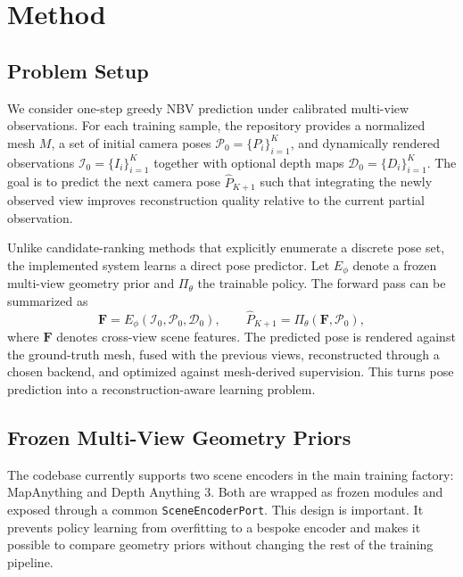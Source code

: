 \section{Method}
\label{sec:method}

\subsection{Problem Setup}
\label{sec:problem}

We consider one-step greedy NBV prediction under calibrated multi-view observations. For each training sample, the repository provides a normalized mesh $M$, a set of initial camera poses $\mathcal{P}_{0}=\{P_i\}_{i=1}^{K}$, and dynamically rendered observations $\mathcal{I}_{0}=\{I_i\}_{i=1}^{K}$ together with optional depth maps $\mathcal{D}_{0}=\{D_i\}_{i=1}^{K}$. The goal is to predict the next camera pose $\hat{P}_{K+1}$ such that integrating the newly observed view improves reconstruction quality relative to the current partial observation.

Unlike candidate-ranking methods that explicitly enumerate a discrete pose set, the implemented system learns a direct pose predictor. Let $E_{\phi}$ denote a frozen multi-view geometry prior and $\Pi_{\theta}$ the trainable policy. The forward pass can be summarized as
\begin{equation}
    \mathbf{F} = E_{\phi}(\mathcal{I}_{0}, \mathcal{P}_{0}, \mathcal{D}_{0}), \qquad
    \hat{P}_{K+1} = \Pi_{\theta}(\mathbf{F}, \mathcal{P}_{0}),
\end{equation}
where $\mathbf{F}$ denotes cross-view scene features. The predicted pose is rendered against the ground-truth mesh, fused with the previous views, reconstructed through a chosen backend, and optimized against mesh-derived supervision. This turns pose prediction into a reconstruction-aware learning problem.

\subsection{Frozen Multi-View Geometry Priors}
\label{sec:frozen_prior}

The codebase currently supports two scene encoders in the main training factory: MapAnything and Depth Anything 3. Both are wrapped as frozen modules and exposed through a common \texttt{SceneEncoderPort}. This design is important. It prevents policy learning from overfitting to a bespoke encoder and makes it possible to compare geometry priors without changing the rest of the training pipeline.

